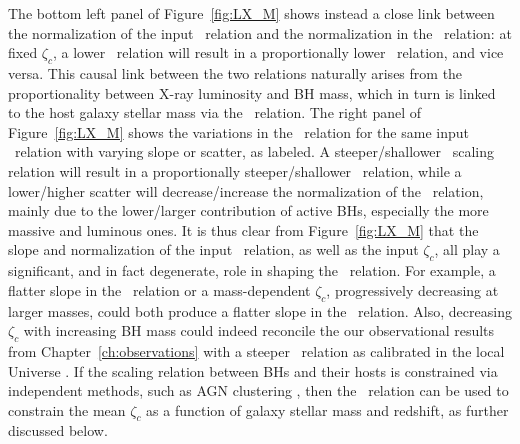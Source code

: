 The bottom left panel of Figure~\ref{fig:LX_M} shows instead a close link between the normalization of the input \MBHMS\ relation and the normalization in the \LXMS\ relation: at fixed $\zeta_c$, a lower \MBHMS\ relation will result in a proportionally lower \LXMS\ relation, and vice versa. This causal link between the two relations naturally arises from the proportionality between X-ray luminosity and BH mass, which in turn is linked to the host galaxy stellar mass via the \MBHMS\ relation. The right panel of Figure~\ref{fig:LX_M} shows the variations in the \LXMS\ relation for the same input \MBHMS\ relation with varying slope or scatter, as labeled. A steeper/shallower \MBHMS\ scaling relation will result in a proportionally steeper/shallower \LXMS\ relation, while a lower/higher scatter will decrease/increase the normalization of the \LXMS\ relation, mainly due to the lower/larger contribution of active BHs, especially the more massive and luminous ones. It is thus clear from Figure~\ref{fig:LX_M} that the slope and normalization of the input \MBHMS\ relation, as well as the input $\zeta_c$, all play a significant, and in fact degenerate, role in shaping the \LXMS\ relation. For example, a flatter slope in the \MBHMS\ relation or a mass-dependent $\zeta_c$, progressively decreasing at larger masses, could both produce a flatter slope in the \LXMS\ relation. Also, decreasing $\zeta_c$ with increasing BH mass could indeed reconcile the our observational results from Chapter~\ref{ch:observations} with a steeper \MBHMS\ relation as calibrated in the local Universe \citep[e.g.,][]{2016MNRAS.460.3119S,2018ApJ...869..113D}. If the scaling relation between BHs and their hosts is constrained via independent methods, such as AGN clustering \citep[e.g.,][]{ShankarNat,Allevato21}, then the \LXMS\ relation can be used to constrain the mean $\zeta_c$ as a function of galaxy stellar mass and redshift, as further discussed below.



